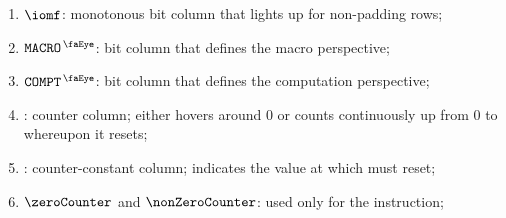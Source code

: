 \begin{enumerate}
    \item
	$\iomf$:
	monotonous bit column that lights up for non-padding rows;
    \item
	$\isRlpUtilsMacro$:
	bit column that defines the macro perspective;
    \item
	$\isRlpUtilsCompt$:
	bit column that defines the computation perspective;
    \item
	\ct{}:
	counter column; 
	either hovers around $0$ or counts continuously up from $0$ to \maxCt{} whereupon it resets;
    \item
	\maxCt:
	counter-constant column;
	indicates the value at which \ct{} must reset;
    \item
	$\zeroCounter$ and
	$\nonZeroCounter$:
	used only for the  instruction;
\end{enumerate}
